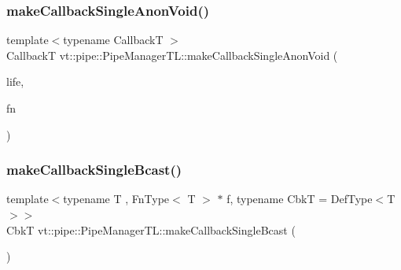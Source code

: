 \mbox{\label{structvt_1_1pipe_1_1_pipe_manager_t_l_a92e209618d7e21e150a1f13ae4e813d4}} 
\subsubsection{\texorpdfstring{make\+Callback\+Single\+Anon\+Void()}{makeCallbackSingleAnonVoid()}\hspace{0.1cm}{\footnotesize\ttfamily [2/2]}}
{\footnotesize\ttfamily template$<$typename CallbackT $>$ \\
CallbackT vt\+::pipe\+::\+Pipe\+Manager\+T\+L\+::make\+Callback\+Single\+Anon\+Void (\begin{DoxyParamCaption}\item[{\hyperlink{namespacevt_1_1pipe_acb42b284378c0fdac1d7c6335dc26f58}{Lifetime\+Enum}}]{life,  }\item[{\hyperlink{structvt_1_1pipe_1_1_pipe_manager_base_acd6f0c71f38f08d53f85e83b65406d77}{Func\+Void\+Type}}]{fn }\end{DoxyParamCaption})}

\mbox{\label{structvt_1_1pipe_1_1_pipe_manager_t_l_a756fde11660cadf687a73aecccf2ecaa}} 
\subsubsection{\texorpdfstring{make\+Callback\+Single\+Bcast()}{makeCallbackSingleBcast()}\hspace{0.1cm}{\footnotesize\ttfamily [1/2]}}
{\footnotesize\ttfamily template$<$typename T , Fn\+Type$<$ T $>$ $\ast$ f, typename CbkT  = Def\+Type$<$\+T$>$$>$ \\
CbkT vt\+::pipe\+::\+Pipe\+Manager\+T\+L\+::make\+Callback\+Single\+Bcast (\begin{DoxyParamCaption}{ }\end{DoxyParamCaption})}


